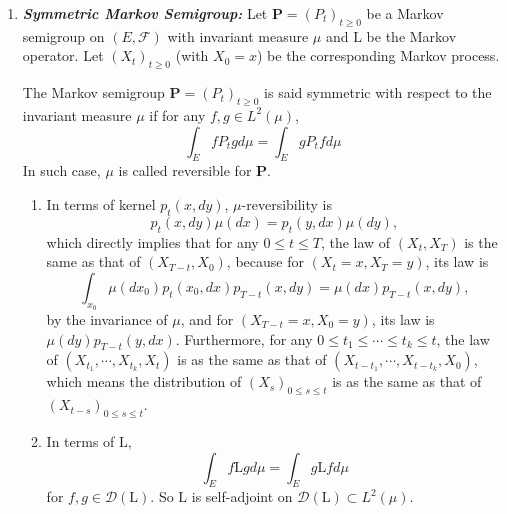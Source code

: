\begin{enumerate}[label=\arabic{*}.]
	\item \textbf{\emph{Symmetric Markov Semigroup:}} Let $\mathbf{P} = (P_t)_{t \geq 0}$ be a Markov semigroup on $(E,\mathcal{F})$ with invariant measure $\mu$ and $\mathrm{L}$ be the Markov operator. Let $(X_t)_{t \geq 0}$ (with $X_0 = x$) be the corresponding Markov process. 

	\begin{defn}
	    The Markov semigroup $\mathbf{P} = (P_t)_{t \geq 0}$ is said symmetric  with respect to the invariant measure $\mu$ if for any $f,g \in L^2(\mu)$,
	    \begin{equation*}
	    	\int_E f P_t g d \mu=\int_E g P_t f d \mu
	    \end{equation*}
	    In such case, $\mu$ is called reversible for $\mathbf{P}$.
	\end{defn}

	\begin{rmk}
	    \begin{enumerate}[label=(\arabic{*})]
	    	\item In terms of kernel $p_t(x,dy)$, $\mu$-reversibility is
	    	\begin{equation*}
	    	    p_t(x,dy)\mu(dx) = p_t(y,dx)\mu(dy),
	    	\end{equation*}
	    	which directly implies that for any $0 \leq t \leq T$, the law of $(X_t,X_T)$ is the same as that of $(X_{T-t},X_0)$, because for $(X_t=x,X_T=y)$, its law is
	    	\begin{equation*}
	    	    \int_{x_0}\mu(dx_0)p_t(x_0,dx)p_{T-t}(x,dy) = \mu(dx)p_{T-t}(x,dy),
	    	\end{equation*}
	    	by the invariance of $\mu$, and for $(X_{T-t}=x,X_0=y)$, its law is $\mu(dy)p_{T-t}(y,dx)$. Furthermore, for any $0 \leq t_1 \leq \cdots \leq t_k \leq t$, the law of $(X_{t_1},\cdots,X_{t_k},X_t)$ is as the same as that of $(X_{t-t_1},\cdots,X_{t-t_k},X_0)$, which means the distribution of $(X_s)_{0\leq s \leq t}$ is as the same as that of $(X_{t-s})_{0\leq s \leq t}$.
	    	
	    	\item In terms of $\mathrm{L}$,
	    	\begin{equation*}
	    	    \int_E f \mathrm{L} g d \mu=\int_E g \mathrm{L} f d \mu
	    	\end{equation*}
	    	for $f,g \in \mathcal{D}(\mathrm{L})$. So $\mathrm{L}$ is self-adjoint on $\mathcal{D}(\mathrm{L}) \subset L^2(\mu)$.	
	    \end{enumerate}
	\end{rmk}


\end{enumerate}
